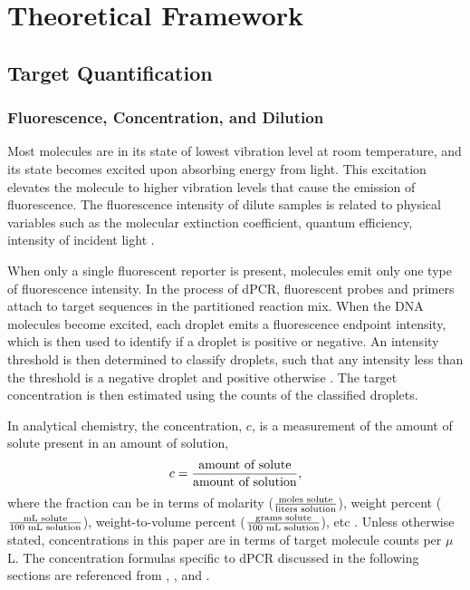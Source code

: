 \chapter{Theoretical Framework}
\label{sec:theoreticalframework} 

\section{Target Quantification}
\label{sec:dpcr_ch3}

\subsection{Fluorescence, Concentration, and Dilution}
\label{sec:targetconc_ch3_stockDil}
Most molecules are in its state of lowest vibration level at room temperature, and its state becomes excited upon absorbing energy from light. This excitation elevates the molecule to higher vibration levels that cause the emission of fluorescence. The fluorescence intensity of dilute samples is related to physical variables such as the molecular extinction coefficient, quantum efficiency, intensity of incident light \cite{Elmer2000}.

When only a single fluorescent reporter is present, molecules emit only one type of fluorescence intensity. In the process of dPCR, fluorescent probes and primers attach to target sequences in the partitioned reaction mix. When the DNA molecules become excited, each droplet emits a fluorescence endpoint intensity, which is then used to identify if a droplet is positive or negative. An intensity threshold is then determined to classify droplets, such that any intensity less than the threshold is a negative droplet and positive otherwise \cite{Trypsteen2015}. The target concentration is then estimated using the counts of the classified droplets.

In analytical chemistry, the concentration, \(c\), is a measurement of the amount of solute present in an amount of solution,
\[
    c = \frac{\textup{amount of solute}}{\textup{amount of solution}},
\]
\noindent
where the fraction can be in terms of molarity (\(\frac{\textup{moles solute}}{\textup{liters solution}}\)), weight percent (\(\frac{\textup{mL solute}}{\textup{100 mL solution}}\)), weight-to-volume percent (\(\frac{\textup{grams solute}}{\textup{100 mL solution}}\)), etc \cite{Harvey2010}. Unless otherwise stated, concentrations in this paper are in terms of target molecule counts per \(\mu\)L. The concentration formulas specific to dPCR discussed in the following sections are referenced from , , and . 

